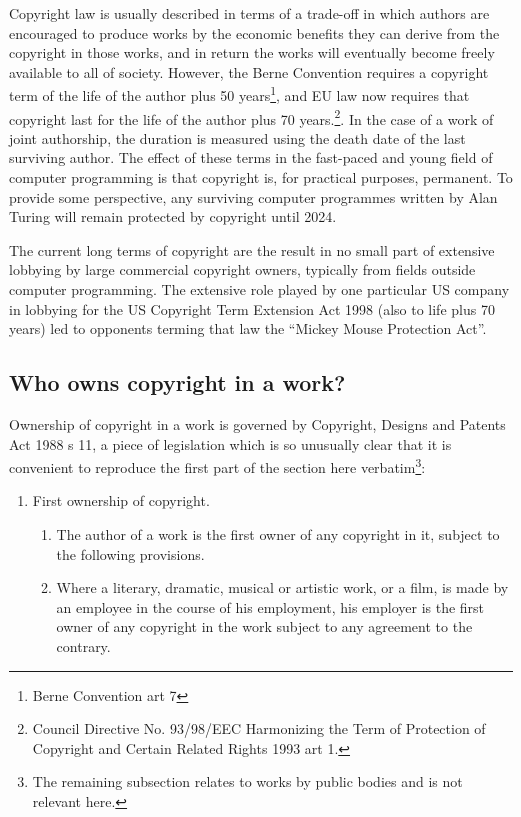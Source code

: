 \documentclass[a4paper,12pt]{article}
\newcommand{\CDPA}[1][]{Copyright, Designs and Patents Act 1988 #1\xspace}
\newcommand{\Berne}[1][]{Berne Convention #1\xspace}
\begin{document}
Copyright law is usually described in terms of a trade-off in which authors
are encouraged to produce works by the economic benefits they can derive
from the copyright in those works, and in return the works will eventually
become freely available to all of society. However, the Berne Convention
requires a copyright term of the life of the author plus 50 years\footnote{\Berne[art 7]}, and EU
law now requires that copyright last for the life of the author plus 70
years.\footnote{Council Directive No. 93/98/EEC Harmonizing
  the Term of Protection of Copyright and Certain Related Rights 1993 art
  1.}. In the case of a work of joint authorship, the duration is measured
using the death date of the last surviving author. The effect of these terms
in the fast-paced and young field of computer programming is that copyright
is, for practical purposes, permanent. To provide some perspective, any
surviving computer programmes written by Alan Turing will remain protected
by copyright until 2024.

The current long terms of copyright are the result in no small part of
extensive lobbying by large commercial copyright owners, typically from
fields outside computer programming. The extensive role played by one
particular US company in lobbying for the US Copyright Term Extension Act 1998 (also to
life plus 70 years) led to opponents terming that law the ``Mickey Mouse
Protection Act''.

\subsection{Who owns copyright in a work?}
 
Ownership of copyright in a work is governed by \CDPA[s 11], a piece of
legislation which is so unusually clear that it is convenient to reproduce
the first part of the section here verbatim\footnote{The remaining subsection relates to works by public
  bodies and is not relevant here.}:
\begin{enumerate}
  \addtocounter{enumi}{10}
\item First ownership of copyright. 
  \renewcommand{\labelenumii}{(\arabic{enumii})}
  \begin{enumerate}
  \item The author of a work is the first owner of any copyright in it, subject to the following provisions.
  \item Where a literary, dramatic, musical or artistic work, or a film, is
    made by an employee in the course of his employment, his employer is the
    first owner of any copyright in the work subject to any agreement to the
    contrary.
  \end{enumerate}
\end{enumerate}
\end{document}
